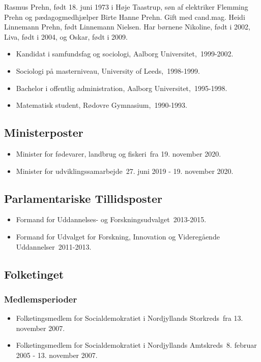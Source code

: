 \documentclass[11pt, a4paper]{awesome-cv}
\begin{document}
\makecvheader[R]
\makelettertitle
\begin{cvletter}
Rasmus Prehn, født 18. juni 1973 i Høje Taastrup, søn af elektriker Flemming Prehn og pædagogmedhjælper Birte Hanne Prehn. Gift med cand.mag. Heidi Linnemann Prehn, født Linnemann Nielsen. Har børnene Nikoline, født i 2002, Liva, født i 2004, og Oskar, født i 2009.

\begin{itemize}
\item Kandidat i samfundsfag og sociologi, Aalborg Universitet, 1999-2002.
\item Sociologi på masterniveau, University of Leeds, 1998-1999.
\item Bachelor i offentlig administration, Aalborg Universitet, 1995-1998.
\item Matematisk student, Rødovre Gymnasium, 1990-1993.
\end{itemize}
\subsection*{Ministerposter}
\begin{itemize}
\item Minister for fødevarer, landbrug og fiskeri fra 19. november 2020.
\item Minister for udviklingssamarbejde 27. juni 2019 - 19. november 2020.
\end{itemize}
\subsection*{Parlamentariske Tillidsposter}
\begin{itemize}
\item Formand for Uddannelses- og Forskningsudvalget 2013-2015.
\item Formand for Udvalget for Forskning, Innovation og Videregående Uddannelser 2011-2013.
\end{itemize}
\subsection*{Folketinget}
\subsubsection*{Medlemsperioder}
\begin{itemize}
\item Folketingsmedlem for Socialdemokratiet i Nordjyllands Storkreds fra 13. november 2007.
\item Folketingsmedlem for Socialdemokratiet i Nordjyllands Amtskreds 8. februar 2005 - 13. november 2007.
\end{itemize}

\end{cvletter}
\end{document}
